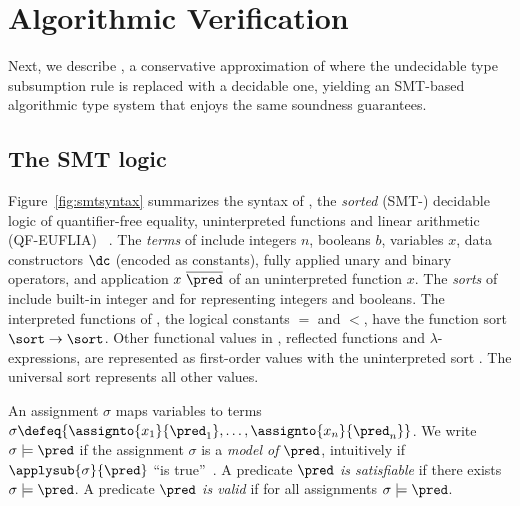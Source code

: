 \section{Algorithmic Verification}\label{sec:algorithmic}

Next, we describe \smtlan, a conservative approximation
of \corelan where the undecidable type subsumption rule
is replaced with a decidable one, yielding an SMT-based
algorithmic type system that enjoys the same soundness
guarantees.

\subsection{The SMT logic \smtlan}



%
Figure~\ref{fig:smtsyntax} summarizes the syntax
of \smtlan, the \emph{sorted} (SMT-)
decidable logic of quantifier-free equality,
uninterpreted functions and linear
arithmetic (QF-EUFLIA) ~\citep{Nelson81,SMTLIB2}.
%
The \emph{terms} of \smtlan include
integers $n$,
booleans $b$,
variables $x$,
data constructors $\dc$ (encoded as constants),
fully applied unary \unop and binary \binop operators,
and application $x\ \overline{\pred}$ of an uninterpreted function $x$.
%
The \emph{sorts} of \smtlan include built-in
integer \tint and \tbool for representing
integers and booleans.
%
The interpreted functions of \smtlan, \eg
the logical constants $=$ and $<$,
have the function sort $\sort \rightarrow \sort$.
%
Other functional values in \corelan, \eg
reflected \corelan functions and
$\lambda$-expressions, are represented as
first-order values with
the uninterpreted sort \tsmtfun{\sort}{\sort}.
%
The universal sort \tuniv represents all other values.

%
An assignment $\sigma$ maps
variables to terms
%
$\sigma \defeq \{ \assignto{x_1}{\pred_1}, \ldots, \assignto{x_n}{\pred_n}\}$.
%
We write
%
${\sigma \models \pred}$
%
if the assignment $\sigma$ is a
\emph{model of} $\pred$, intuitively
if $\applysub{\sigma}{\pred}$ ``is true''~\cite{Nelson81}.
%
A predicate $\pred$ \emph{is satisfiable} if
there exists ${\sigma\models\pred}$.
%
A predicate $\pred$ \emph{is valid} if
for all assignments ${\sigma\models\pred}$.


